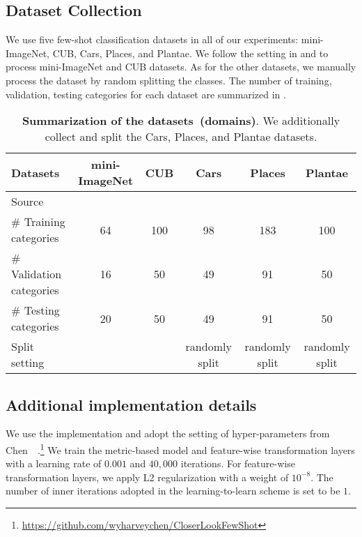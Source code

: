\subsection{Dataset Collection}
\label{sec:apx1}
We use five few-shot classification datasets in all of our experiments: mini-ImageNet, CUB, Cars, Places, and Plantae.
We follow the setting in \citet{ravi2017metalstm} and \citet{hilliard2018few} to process mini-ImageNet and CUB datasets.
As for the other datasets, we manually process the dataset by random splitting the classes.
The number of training, validation, testing categories for each dataset are summarized in .

\begin{table}[h]\tiny
\centering
\caption{\textbf{Summarization of the datasets~(domains)}. We additionally collect and split the Cars, Places, and Plantae datasets.}
\label{tab:datasets}
\begin{tabular}{l ccccc}
  \toprule
  Datasets & mini-ImageNet & CUB & Cars & Places & Plantae \\
  \midrule
  Source & \citet{deng2009imagenet} & \citet{WelinderEtal2010cub} & \citet{KrauseStarkDengFei-Fei_3DRR2013} & \citet{zhou2017places} & \citet{van2018inaturalist} \\ 
  \# Training categories & 64 & 100 & 98 & 183 & 100 \\
  \# Validation categories & 16 & 50 & 49 & 91 & 50 \\
  \# Testing categories & 20 & 50 & 49 & 91 & 50 \\
  Split setting & \citet{ravi2017metalstm} & \citet{hilliard2018few} & randomly split & randomly split & randomly split \\
  \bottomrule
\end{tabular}
\end{table}

\subsection{Additional implementation details}
\label{sec:apx2}
We use the implementation and adopt the setting of hyper-parameters from Chen~\etal~\citep{chen2019closerfewshot}.\footnote{\url{https://github.com/wyharveychen/CloserLookFewShot}}
We train the metric-based model and feature-wise transformation layers with a learning rate of $0.001$ and $40,000$ iterations.
For feature-wise transformation layers, we apply L2 regularization with a weight of $10^{-8}$.
The number of inner iterations adopted in the learning-to-learn scheme is set to be $1$.

